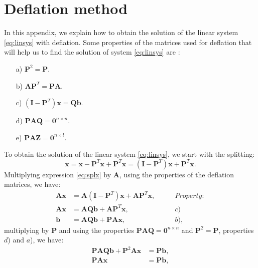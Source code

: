 \documentclass[12pt]{article}
\numberwithin{equation}{section}
\begin{document}

\section{Deflation method}\label{a4}
In this appendix, we explain how to obtain the solution of the linear system \eqref{eq:linsys} with deflation.
Some properties of the matrices used for deflation that will help us to find the solution of system \eqref{eq:linsys} are \cite{Tang09}:
\begin{enumerate}\label{defprop}
 \item[a)] $\mathbf{P}^2=\mathbf{P}.$
 \item[b)] $\mathbf{A}\mathbf{P}^T=\mathbf{P}\mathbf{A}.$
 \item[c)] $(\mathbf{I}-\mathbf{P}^T)\mathbf{x}=\mathbf{Q}\mathbf{b}.$
 \item[d)]$\mathbf{P}\mathbf{A}\mathbf{Q}=\mathbf{0}^{n\times n}.$
  \item[e)]$\mathbf{P}\mathbf{A}\mathbf{Z}=\mathbf{0}^{n\times l}.$
\end{enumerate}
To obtain the solution of the linear system \eqref{eq:linsys}, we start with the splitting:
\begin{equation}\label{eq:splx}
    \mathbf{x}=\mathbf{x}-\mathbf{P}^T\mathbf{x}+\mathbf{P}^T\mathbf{x}=(\mathbf{I}-\mathbf{P}^T)\mathbf{x}+\mathbf{P}^T\mathbf{x}.
\end{equation}
Multiplying expression \eqref{eq:splx} by $\mathbf{A}$, using the properties of the deflation matrices, we have:
\begin{align*}
\mathbf{A}\mathbf{x}&=\mathbf{A}(\mathbf{I}-\mathbf{P}^T)\mathbf{x}+\mathbf{A}\mathbf{P}^T\mathbf{x},\qquad&Property:\\
\mathbf{A}\mathbf{x}&=\mathbf{A}\mathbf{Q}\mathbf{b}+\mathbf{A}\mathbf{P}^T\mathbf{x},&c)\\
\mathbf{b}&=\mathbf{A}\mathbf{Q}\mathbf{b}+\mathbf{P}\mathbf{A}\mathbf{x},&b),
\end{align*}
multiplying by $\mathbf{P}$ and using the properties $\mathbf{P}\mathbf{A}\mathbf{Q}=
\mathbf{0}^{n\times n}$ and $\mathbf{P}^2=\mathbf{P}$, properties $d$) and $a$), we have:
\begin{align*}
\mathbf{P}\mathbf{A}\mathbf{Q}\mathbf{b}+\mathbf{P}^2\mathbf{A}\mathbf{x}&=\mathbf{P}\mathbf{b},\nonumber \\
\mathbf{P}\mathbf{A}\mathbf{x}&=\mathbf{P}\mathbf{b},
\end{align*}
\end{document}
